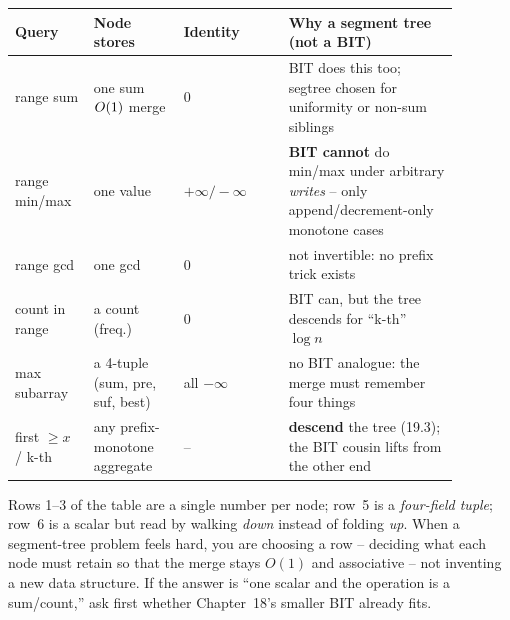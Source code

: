 \begin{center}
\small
\renewcommand{\arraystretch}{1.25}
\begin{tabular}{@{}p{0.15\linewidth} p{0.18\linewidth} p{0.21\linewidth} p{0.34\linewidth}@{}}
\toprule
\textbf{Query} & \textbf{Node stores} & \textbf{Identity} & \textbf{Why a segment tree (not a BIT)} \\
\midrule
range sum & one sum \(O(1)\) merge & \(0\) & BIT does this too; segtree chosen for uniformity or non-sum siblings \\
range min/max & one value & \(+\infty / -\infty\) & \textbf{BIT cannot} do min/max under arbitrary \emph{writes} -- only append/decrement-only monotone cases \\
range gcd & one gcd & \(0\) & not invertible: no prefix trick exists \\
count in range & a count (freq.) & \(0\) & BIT can, but the tree descends for ``k-th'' \(\log n\) \\
max subarray & a 4-tuple (sum, pre, suf, best) & all \(-\infty\) & no BIT analogue: the merge must remember four things \\
first \(\ge x\) / k-th & any prefix-monotone aggregate & -- & \textbf{descend} the tree (19.3); the BIT cousin lifts from the other end \\
\bottomrule
\end{tabular}
\end{center}

\begin{insightbox}
Rows 1--3 of the table are a single number per node; row~5 is a
\emph{four-field tuple}; row~6 is a scalar but read by walking \emph{down}
instead of folding \emph{up}.  When a segment-tree problem feels hard, you are
choosing a row -- deciding what each node must retain so that the merge stays
\(O(1)\) and associative -- not inventing a new data structure.  If the answer
is ``one scalar and the operation is a sum/count,'' ask first whether
Chapter~18's smaller BIT already fits.
\end{insightbox}

